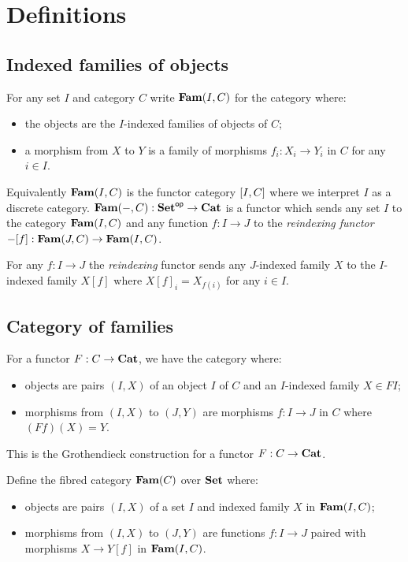 \section{Definitions}

\subsection{Indexed families of objects}

For any set $I$ and category $C$ write $\mathbf{Fam}(I,C)$ for the category where:
\begin{itemize}
\item the objects are the $I$-indexed families of objects of $C$;
\item a morphism from $X$ to $Y$ is a family of morphisms $f_i: X_i \to Y_i$ in $C$ for any $i \in I$.
\end{itemize}

\noindent Equivalently $\mathbf{Fam}(I,C)$ is the functor category $[I,C]$ where we interpret $I$ as a discrete
category. $\mathbf{Fam}(-,C): \mathbf{Set}^{\mathsf{op}} \to \mathbf{Cat}$ is a functor which sends any set $I$ to the category $\mathbf{Fam}(I,C)$
and any function $f: I \to J$ to the \emph{reindexing functor} $-[f]: \mathbf{Fam}(J,C) \to \mathbf{Fam}(I,C)$.

\begin{definition}[Reindexing]
For any $f: I \to J$ the \emph{reindexing} functor sends any $J$-indexed family $X$ to the $I$-indexed family
$X[f]$ where $X[f]_i = X_{f(i)}$ for any $i \in I$.
\end{definition}

\subsection{Category of families}

For a functor $F: C \to \mathbf{Cat}$, we have the category where:
\begin{itemize}
\item objects are pairs $(I, X)$ of an object $I$ of $C$ and an $I$-indexed family $X \in FI$;
\item morphisms from $(I, X)$ to $(J, Y)$ are morphisms $f: I \to J$ in $C$ where $(Ff)(X) = Y$.
\end{itemize}

\noindent This is the Grothendieck construction for a functor $F: C \to \mathbf{Cat}$.

Define the fibred category $\mathbf{Fam}(C)$ over $\mathbf{Set}$ where:
\begin{itemize}
\item objects are pairs $(I, X)$ of a set $I$ and indexed family $X$ in $\mathbf{Fam}(I,C)$;
\item morphisms from $(I, X)$ to $(J, Y)$ are functions $f: I \to J$ paired with morphisms $X \to Y[f]$ in
$\mathbf{Fam}(I,C)$.
\end{itemize}

